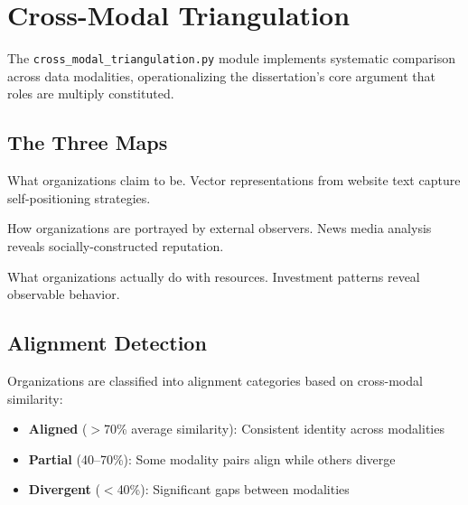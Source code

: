 \documentclass[../main.tex]{subfiles}
\begin{document}
\section{Cross-Modal Triangulation}
\label{sec:crunchbase-triangulation}

The \texttt{cross\_modal\_triangulation.py} module implements systematic
comparison across data modalities, operationalizing the dissertation's
core argument that roles are multiply constituted.

\subsection{The Three Maps}

\begin{description}[leftmargin=0.5cm, itemsep=0.4em]
\item[Declared Map (\cref{app:websites}).]
What organizations claim to be.
Vector representations from website text capture self-positioning strategies.

\item[Attributed Map (\cref{app:news-media}).]
How organizations are portrayed by external observers.
News media analysis reveals socially-constructed reputation.

\item[Enacted Map (Crunchbase).]
What organizations actually do with resources.
Investment patterns reveal observable behavior.
\end{description}

\subsection{Alignment Detection}

Organizations are classified into alignment categories based on
cross-modal similarity:

\begin{itemize}[leftmargin=*, itemsep=0.2em]
\item \textbf{Aligned} ($>$70\% average similarity): Consistent identity across modalities
\item \textbf{Partial} (40--70\%): Some modality pairs align while others diverge
\item \textbf{Divergent} ($<$40\%): Significant gaps between modalities
\end{itemize}
\end{document}
